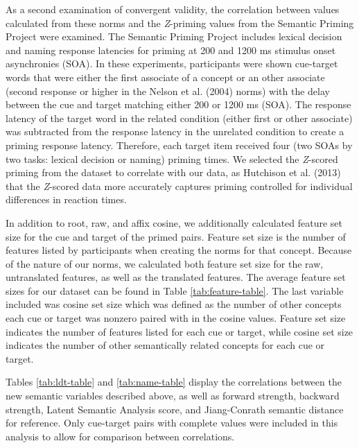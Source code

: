 \documentclass[english,,man]{apa6}
\theoremstyle{definition}
\theoremstyle{definition}
\theoremstyle{definition}
\theoremstyle{remark}
\begin{document}
As a second examination of convergent validity, the correlation between
values calculated from these norms and the \emph{Z}-priming values from
the Semantic Priming Project were examined. The Semantic Priming Project
includes lexical decision and naming response latencies for priming at
200 and 1200 ms stimulus onset asynchronies (SOA). In these experiments,
participants were shown cue-target words that were either the first
associate of a concept or an other associate (second response or higher
in the Nelson et al. (2004) norms) with the delay between the cue and
target matching either 200 or 1200 ms (SOA). The response latency of the
target word in the related condition (either first or other associate)
was subtracted from the response latency in the unrelated condition to
create a priming response latency. Therefore, each target item received
four (two SOAs by two tasks: lexical decision or naming) priming times.
We selected the \emph{Z}-scored priming from the dataset to correlate
with our data, as Hutchison et al. (2013) that the \emph{Z}-scored data
more accurately captures priming controlled for individual differences
in reaction times.

In addition to root, raw, and affix cosine, we additionally calculated
feature set size for the cue and target of the primed pairs. Feature set
size is the number of features listed by participants when creating the
norms for that concept. Because of the nature of our norms, we
calculated both feature set size for the raw, untranslated features, as
well as the translated features. The average feature set sizes for our
dataset can be found in Table \ref{tab:feature-table}. The last variable
included was cosine set size which was defined as the number of other
concepts each cue or target was nonzero paired with in the cosine
values. Feature set size indicates the number of features listed for
each cue or target, while cosine set size indicates the number of other
semantically related concepts for each cue or target.

Tables \ref{tab:ldt-table} and \ref{tab:name-table} display the
correlations between the new semantic variables described above, as well
as forward strength, backward strength, Latent Semantic Analysis score,
and Jiang-Conrath semantic distance for reference. Only cue-target pairs
with complete values were included in this analysis to allow for
comparison between correlations.
\end{document}
